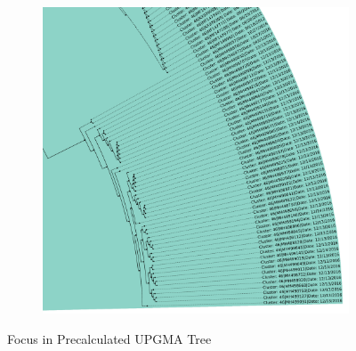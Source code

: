 \begin{figure}[!hbt]
\begin{subfigure}[t]{0.475\textwidth}
        \includegraphics[width=\textwidth]{Graphics/identical.pdf}
    \end{subfigure}
    \caption[Focus in Precalculated \Acrshort{UPGMA} Tree]{Focus in Precalculated \Acrshort{UPGMA} Tree}
    \label{fig:focus}
\end{figure}

